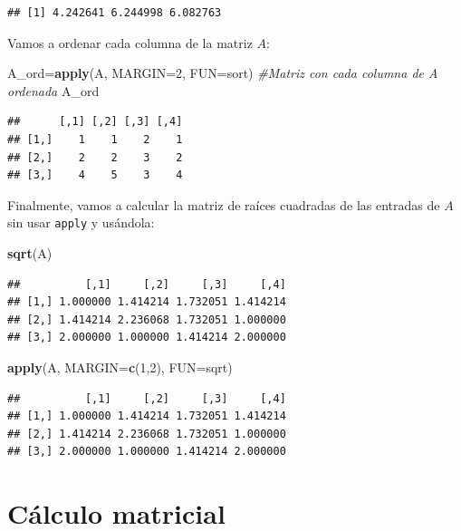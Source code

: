 \documentclass[]{book}
\newenvironment{Shaded}{\begin{snugshade}}{\end{snugshade}}
\newcommand{\CommentTok}[1]{\textcolor[rgb]{0.56,0.35,0.01}{\textit{#1}}}
\newcommand{\DataTypeTok}[1]{\textcolor[rgb]{0.13,0.29,0.53}{#1}}
\newcommand{\DecValTok}[1]{\textcolor[rgb]{0.00,0.00,0.81}{#1}}
\newcommand{\KeywordTok}[1]{\textcolor[rgb]{0.13,0.29,0.53}{\textbf{#1}}}
\newcommand{\NormalTok}[1]{#1}
\theoremstyle{definition}
\theoremstyle{definition}
\theoremstyle{definition}
\theoremstyle{remark}
\begin{document}
\begin{verbatim}
## [1] 4.242641 6.244998 6.082763
\end{verbatim}

Vamos a ordenar cada columna de la matriz \(A\):

\begin{Shaded}
\begin{Highlighting}[]
\NormalTok{A_ord=}\KeywordTok{apply}\NormalTok{(A, }\DataTypeTok{MARGIN=}\DecValTok{2}\NormalTok{, }\DataTypeTok{FUN=}\NormalTok{sort)  }\CommentTok{#Matriz con cada columna de A ordenada}
\NormalTok{A_ord}
\end{Highlighting}
\end{Shaded}

\begin{verbatim}
##      [,1] [,2] [,3] [,4]
## [1,]    1    1    2    1
## [2,]    2    2    3    2
## [3,]    4    5    3    4
\end{verbatim}

Finalmente, vamos a calcular la matriz de raíces cuadradas de las entradas de \(A\)
sin usar \texttt{apply} y usándola:

\begin{Shaded}
\begin{Highlighting}[]
\KeywordTok{sqrt}\NormalTok{(A)  }
\end{Highlighting}
\end{Shaded}

\begin{verbatim}
##          [,1]     [,2]     [,3]     [,4]
## [1,] 1.000000 1.414214 1.732051 1.414214
## [2,] 1.414214 2.236068 1.732051 1.000000
## [3,] 2.000000 1.000000 1.414214 2.000000
\end{verbatim}

\begin{Shaded}
\begin{Highlighting}[]
\KeywordTok{apply}\NormalTok{(A, }\DataTypeTok{MARGIN=}\KeywordTok{c}\NormalTok{(}\DecValTok{1}\NormalTok{,}\DecValTok{2}\NormalTok{), }\DataTypeTok{FUN=}\NormalTok{sqrt)  }
\end{Highlighting}
\end{Shaded}

\begin{verbatim}
##          [,1]     [,2]     [,3]     [,4]
## [1,] 1.000000 1.414214 1.732051 1.414214
## [2,] 1.414214 2.236068 1.732051 1.000000
## [3,] 2.000000 1.000000 1.414214 2.000000
\end{verbatim}

\hypertarget{calculo-matricial}{%
\section{Cálculo matricial}\label{calculo-matricial}}
\end{document}
